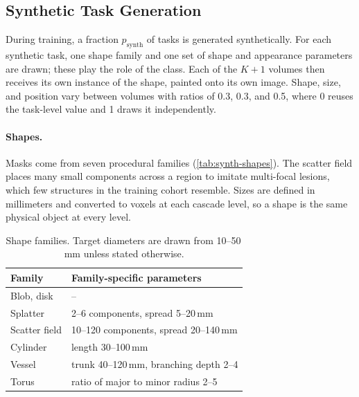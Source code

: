 \subsection{Synthetic Task Generation}\label{sec:methodology-synth}

During training, a fraction $p_{\text{synth}}$ of tasks is generated
synthetically. For each synthetic task, one shape family and one set of shape
and appearance parameters are drawn; these play the role of the class. Each of
the $K+1$ volumes then receives its own instance of the shape, painted onto its
own image. Shape, size, and position vary between volumes with ratios of 0.3,
0.3, and 0.5, where 0 reuses the task-level value and 1 draws it
independently.

\paragraph{Shapes.}
Masks come from seven procedural families (\autoref{tab:synth-shapes}). The
scatter field places many small components
across a region to imitate multi-focal lesions, which few structures in the
training cohort resemble.
Sizes are defined in millimeters and converted to voxels at each cascade
level, so a shape is the same physical object at every level.

\begin{table}[t]
  \centering
  \small
  \caption{Shape families. Target diameters are drawn from 10--50\,mm unless
  stated otherwise.}
  \label{tab:synth-shapes}
  \begin{tabular}{@{}ll@{}}
    \toprule
    Family & Family-specific parameters \\
    \midrule
    Blob, disk      & -- \\
    Splatter        & 2--6 components, spread 5--20\,mm \\
    Scatter field   & 10--120 components, spread 20--140\,mm \\
    Cylinder        & length 30--100\,mm \\
    Vessel          & trunk 40--120\,mm, branching depth 2--4 \\
    Torus           & ratio of major to minor radius 2--5 \\
    \bottomrule
  \end{tabular}
\end{table}

